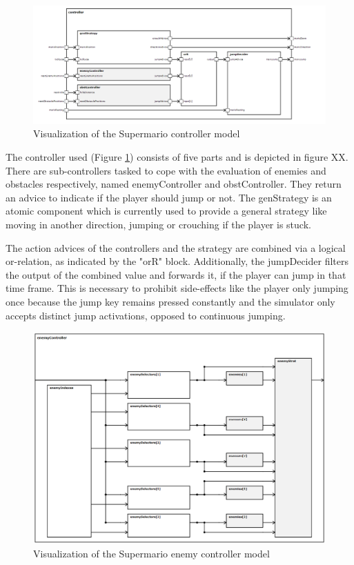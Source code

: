 \begin{figure}
	\centering
	\includegraphics[scale=0.5]{pictures/haller_controller.PNG}
	\caption{Visualization of the Supermario controller model}
	\label{fig:marioController}
\end{figure}

The controller used (Figure \ref{fig:marioController}) consists of five parts and is depicted in figure XX. There are sub-controllers tasked to cope with the evaluation of enemies and obstacles respectively, named enemyController and obstController. They return an advice to indicate if the player should jump or not. The genStrategy is an atomic component which is currently used to provide a general strategy like moving in another direction, jumping or crouching if the player is stuck. 

The action advices of the controllers and the strategy are combined via a logical or-relation, as indicated by the "orR" block. Additionally, the jumpDecider filters the output of the combined value and forwards it, if the player can jump in that time frame. This is necessary to prohibit side-effects like the player only jumping once because the jump key remains pressed constantly and the simulator only accepts distinct jump activations, opposed to continuous jumping.

\begin{figure}
	\centering
	\includegraphics[scale=0.4]{pictures/haller_enemycontroller.PNG}
	\caption{Visualization of the Supermario enemy controller model}
	\label{fig:marioEnemyController}
\end{figure}


